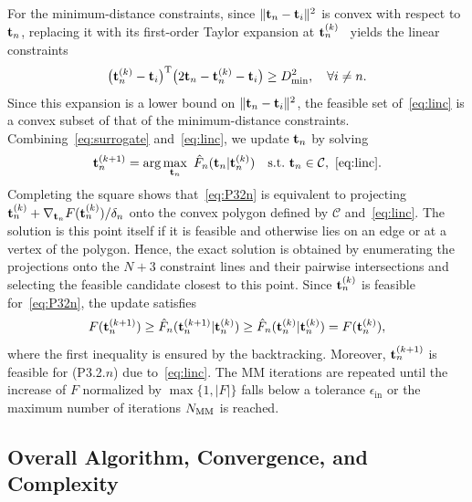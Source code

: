 \documentclass[journal]{IEEEtran}
\newcommand{\rev}[1]{{\color{red}#1}}
\newcommand{\rev}[1]{#1}
\begin{document}
For the minimum-distance constraints, since $\|\mathbf{t}_n-\mathbf{t}_i\|^2$ is convex with respect to $\mathbf{t}_n$, replacing it with its first-order Taylor expansion at $\mathbf{t}_n^{(k)}$~\cite{ZhengTCOM2025} yields the linear constraints
\begin{equation}\label{eq:linc}
\big(\mathbf{t}_n^{(k)}-\mathbf{t}_i\big)^{\mathrm T}\big(2\mathbf{t}_n-\mathbf{t}_n^{(k)}-\mathbf{t}_i\big)\ge D_{\min}^2,\quad\forall i\neq n.
\end{equation}
Since this expansion is a lower bound on $\|\mathbf{t}_n-\mathbf{t}_i\|^2$, the feasible set of~\eqref{eq:linc} is a convex subset of that of the minimum-distance constraints. Combining~\eqref{eq:surrogate} and~\eqref{eq:linc}, we update $\mathbf{t}_n$ by solving
\begin{equation}\label{eq:P32n}
\bt_n^{(k+1)}=\arg\max_{\bt_n}\ \hat F_n(\bt_n|\bt_n^{(k)})\quad\mathrm{s.t.}\ \bt_n\in\mathcal C,\ \eqref{eq:linc}.
\end{equation}
Completing the square shows that~\eqref{eq:P32n} is equivalent to projecting $\mathbf{t}_n^{(k)}+\nabla_{\mathbf{t}_n}F(\mathbf{t}_n^{(k)})/\delta_n$ onto the convex polygon defined by $\mathcal C$ and~\eqref{eq:linc}. The solution is this point itself if it is feasible and otherwise lies on an edge or at a vertex of the polygon. Hence, \rev{the exact solution is obtained by} enumerating the projections onto the $N+3$ constraint lines and their pairwise intersections \rev{and selecting the feasible candidate closest to this point}. Since $\mathbf{t}_n^{(k)}$ is feasible for~\eqref{eq:P32n}, the update satisfies
\begin{equation}\label{eq:mono}
F(\mathbf{t}_n^{(k+1)})\ge\hat F_n(\mathbf{t}_n^{(k+1)}|\mathbf{t}_n^{(k)})\ge\hat F_n(\mathbf{t}_n^{(k)}|\mathbf{t}_n^{(k)})=F(\mathbf{t}_n^{(k)}),
\end{equation}
where the first inequality is ensured by the backtracking. Moreover, $\mathbf{t}_n^{(k+1)}$ is feasible for (P3.2.$n$) due to~\eqref{eq:linc}. The MM iterations are repeated until the increase of $F$ normalized by $\max\{1,|F|\}$ falls below a tolerance $\epsilon_{\mathrm{in}}$ or the maximum number of iterations $N_{\mathrm{MM}}$ is reached.

\subsection{Overall Algorithm, Convergence, and Complexity}\label{sec:overall}
\end{document}
